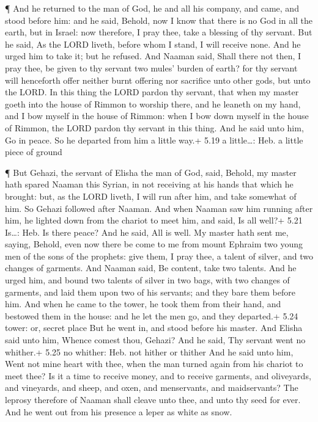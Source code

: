  ¶ And he returned to the man of God, he and all his
company, and came, and stood before him: and he said, Behold, now I know
that there is no God in all the earth, but in Israel: now therefore, I
pray thee, take a blessing of thy servant.  But he said, As
the LORD liveth, before whom I stand, I will receive none. And he urged
him to take it; but he refused.  And Naaman said, Shall
there not then, I pray thee, be given to thy servant two mules' burden
of earth? for thy servant will henceforth offer neither burnt offering
nor sacrifice unto other gods, but unto the LORD.  In this
thing the LORD pardon thy servant, that when my master goeth into the
house of Rimmon to worship there, and he leaneth on my hand, and I bow
myself in the house of Rimmon: when I bow down myself in the house of
Rimmon, the LORD pardon thy servant in this thing.  And he
said unto him, Go in peace. So he departed from him a little way.+ 5.19
a little\ldots: Heb. a little piece of ground

 ¶ But Gehazi, the servant of Elisha the man of God, said,
Behold, my master hath spared Naaman this Syrian, in not receiving at
his hands that which he brought: but, as the LORD liveth, I will run
after him, and take somewhat of him.  So Gehazi followed
after Naaman. And when Naaman saw him running after him, he lighted down
from the chariot to meet him, and said, Is all well?+ 5.21 Is\ldots:
Heb. Is there peace?  And he said, All is well. My master
hath sent me, saying, Behold, even now there be come to me from mount
Ephraim two young men of the sons of the prophets: give them, I pray
thee, a talent of silver, and two changes of garments.  And
Naaman said, Be content, take two talents. And he urged him, and bound
two talents of silver in two bags, with two changes of garments, and
laid them upon two of his servants; and they bare them before him.
 And when he came to the tower, he took them from their
hand, and bestowed them in the house: and he let the men go, and they
departed.+ 5.24 tower: or, secret place  But he went in,
and stood before his master. And Elisha said unto him, Whence comest
thou, Gehazi? And he said, Thy servant went no whither.+ 5.25 no
whither: Heb. not hither or thither  And he said unto him,
Went not mine heart with thee, when the man turned again from his
chariot to meet thee? Is it a time to receive money, and to receive
garments, and oliveyards, and vineyards, and sheep, and oxen, and
menservants, and maidservants?  The leprosy therefore of
Naaman shall cleave unto thee, and unto thy seed for ever. And he went
out from his presence a leper as white as snow.

